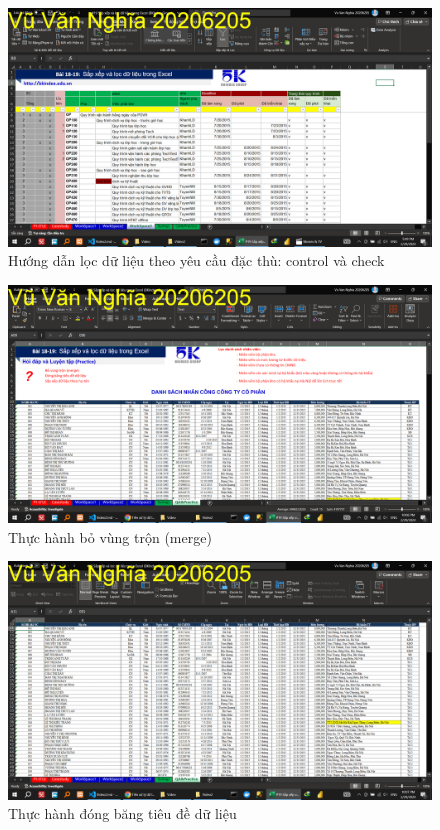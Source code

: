 \documentclass{article}
\begin{document}
\begin{figure}[H]
\centering
\includegraphics[scale = 0.15]{Video2/HuongDan/6.png}
\caption{Hướng dẫn lọc dữ liệu theo yêu cầu đặc thù: control và check}
\end{figure}
\begin{figure}[H]
\centering
\includegraphics[scale = 0.15]{Video2/ThucHanh/0.png}
\caption{Thực hành bỏ vùng trộn (merge)}
\end{figure}

\begin{figure}[H]
\centering
\includegraphics[scale = 0.15]{Video2/ThucHanh/1.png}
\caption{Thực hành đóng băng tiêu đề dữ liệu}
\end{figure}
\end{document}
